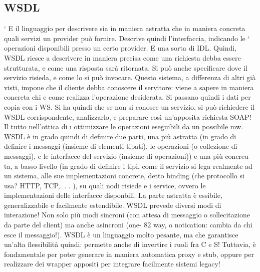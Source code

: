 \subsection{WSDL}
`
E il linguaggio per descrivere sia in maniera astratta che in maniera concreta
quali servizi un provider può fornire. Descrive quindi l'interfaccia, indicando le
`
operazioni disponibili presso un certo provider. E una sorta di IDL. Quindi,
WSDL riesce a descrivere in maniera precisa come una richiesta debba essere
strutturata, e come una risposta sarà ritornata. Si può anche specificare dove il
servizio risieda, e come lo si può invocare.
Questo sistema, a differenza di altri già visti, impone che il cliente debba
conoscere il servitore: viene a sapere in maniera concreta chi e come realizza
l'operazione desiderata. Si passano quindi i dati per copia con i WS. Si ha quindi che se non si conosce un servizio, si
può richiedere il WSDL corrispondente,
analizzarlo, e preparare così un'apposita richiesta SOAP! Il tutto nell'ottica di
\i{}
ottimizzare le operazioni eseguibili da un possibile mw.
WSDL è in grado quindi di definire due parti, una più astratta (in grado
di definire i messaggi (insieme di elementi tipati), le operazioni (o collezione di
messaggi), e le interfacce del servizio (insieme di operazioni)) e una più concreu
ta, a basso livello (in grado di definire i tipi, come il servizio si lega realmente
ad un sistema, alle sue implementazioni concrete, detto binding (che protocollo
si usa? HTTP, TCP,. . . ), su quali nodi risiede e i service, ovvero le implementazioni delle interfacce disponbili. La
parte astratta è essibile, generalizzabile
e facilmente estendibile.
WSDL prevede diversi modi di interazione! Non solo più modi sincroni (con
attesa di messaggio o sollecitazione da parte del client) ma anche asincroni (one-
82
way, o notication: cambia da chi esce il messaggio!).
WSDL è un linguaggio molto pesante, ma che garantisce un'alta flessibilità
quindi: permette anche di invertire i ruoli fra C e S! Tuttavia, è fondamentale
per poter generare in maniera automatica proxy e stub, oppure per realizzare
dei wrapper appositi per integrare facilmente sistemi legacy!
